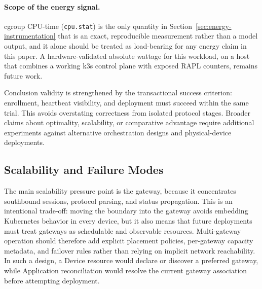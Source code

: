 \begingroup
\color{blue}
\paragraph{Scope of the energy signal.} cgroup CPU-time (\texttt{cpu.stat}) is the only quantity in Section~\ref{sec:energy-instrumentation} that is an exact, reproducible measurement rather than a model output, and it alone should be treated as load-bearing for any energy claim in this paper. 
A hardware-validated absolute wattage for this workload, on a host that combines a working k3s control plane with exposed RAPL counters, remains future work.
\endgroup

Conclusion validity is strengthened by the transactional success criterion: enrollment, heartbeat visibility, and deployment must succeed within the same trial. This avoids overstating correctness from isolated protocol stages. Broader claims about optimality, scalability, or comparative advantage require additional experiments against alternative orchestration designs and physical-device deployments.

\begingroup
\color{red}
\subsection{Scalability and Failure Modes}
The main scalability pressure point is the gateway, because it concentrates southbound sessions, protocol parsing, and status propagation. This is an intentional trade-off: moving the boundary into the gateway avoids embedding Kubernetes behavior in every device, but it also means that future deployments must treat gateways as schedulable and observable resources. Multi-gateway operation should therefore add explicit placement policies, per-gateway capacity metadata, and failover rules rather than relying on implicit network reachability. In such a design, a Device resource would declare or discover a preferred gateway, while Application reconciliation would resolve the current gateway association before attempting deployment.

